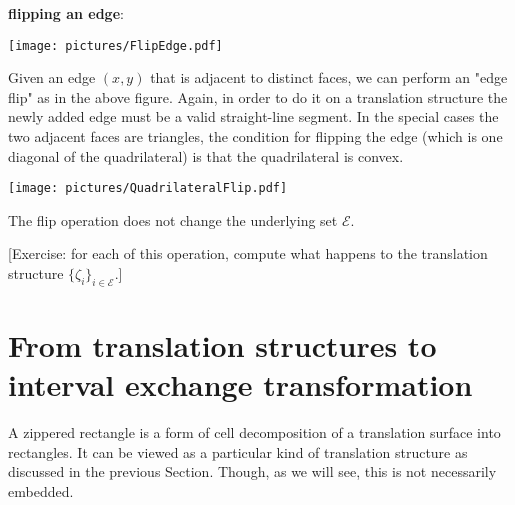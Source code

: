 \documentclass{article}
\def\cE{\mathcal{E}}
\newcommand{\commv}[1]{{\color{red!50!gray}[#1]}}
\begin{document}
\textbf{flipping an edge}:
\begin{center}\texttt{[image: pictures/FlipEdge.pdf]}\end{center}
Given an edge $(x,y)$ that is adjacent to distinct faces, we can perform an
"edge flip" as in the above figure. Again, in order to do it on a translation
structure the newly added edge must be a valid straight-line segment.
In the special cases the two adjacent faces are triangles, the condition
for flipping the edge (which is one diagonal of the quadrilateral) is that the
quadrilateral is convex.
\begin{center}\texttt{[image: pictures/QuadrilateralFlip.pdf]}\end{center}
The flip operation does not change the underlying set $\cE$.

\bigskip

\commv{Exercise: for each of this operation, compute what happens to the
translation structure $\{\zeta_i\}_{i \in \cE}$.}

\section{From translation structures to interval exchange transformation}
A zippered rectangle is a form of cell decomposition of a translation
surface into rectangles. It can be viewed as a particular kind of translation
structure as discussed in the previous Section. Though, as we will see, this
is not necessarily embedded.
\end{document}
